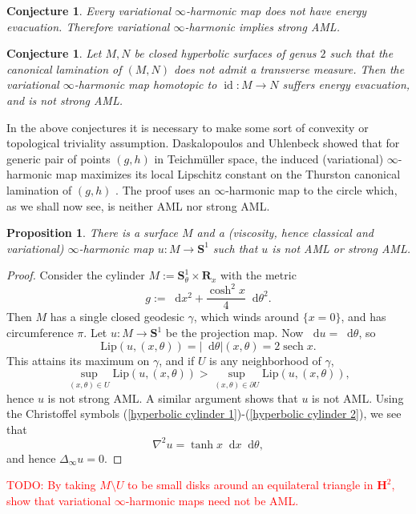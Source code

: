 \documentclass[reqno,11pt]{amsart}
\newcommand{\RR}{\mathbf{R}}
\newcommand{\Hyp}{\mathbf H}
\newcommand{\Sph}{\mathbf S}
\newcommand*\dif{\mathop{}\!\mathrm{d}}
\DeclareMathOperator{\id}{id}
\DeclareMathOperator{\sech}{sech}
\newcommand{\Lip}{\mathrm{Lip}}
\newtheorem{proposition}[theorem]{Proposition}
\newtheorem{conjecture}[theorem]{Conjecture}
\theoremstyle{definition}
\numberwithin{equation}{section}
\newcommand\todo[1]{\textcolor{red}{TODO: #1}}
\begin{document}
\begin{conjecture}
Every variational $\infty$-harmonic map does not have energy evacuation.
Therefore variational $\infty$-harmonic implies strong AML.
\end{conjecture}

\begin{conjecture}
Let $M, N$ be closed hyperbolic surfaces of genus $2$ such that the canonical lamination of $(M, N)$ does not admit a transverse measure.
Then the variational $\infty$-harmonic map homotopic to $\id: M \to N$ suffers energy evacuation, and is not strong AML.
\end{conjecture}

In the above conjectures it is necessary to make some sort of convexity or topological triviality assumption.
Daskalopoulos and Uhlenbeck showed that for generic pair of points $(g, h)$ in Teichm\"uller space, the induced (variational) $\infty$-harmonic map maximizes its local Lipschitz constant on the Thurston canonical lamination of $(g, h)$ \cite[Theorem 8.11]{daskalopoulos2022analytic}.
The proof uses an $\infty$-harmonic map to the circle which, as we shall now see, is neither AML nor strong AML.

\begin{proposition}
There is a surface $M$ and a (viscosity, hence classical and variational) $\infty$-harmonic map $u: M \to \Sph^1$ such that $u$ is not AML or strong AML.
\end{proposition}
\begin{proof}
Consider the cylinder $M := \Sph^1_\theta \times \RR_x$ with the metric
$$g := \dif x^2 + \frac{\cosh^2 x}{4} \dif \theta^2.$$
Then $M$ has a single closed geodesic $\gamma$, which winds around $\{x = 0\}$, and has circumference $\pi$.
Let $u: M \to \Sph^1$ be the projection map.
Now $\dif u = \dif \theta$, so
$$\Lip(u, (x, \theta)) = |\dif \theta|(x, \theta) = 2 \sech x.$$
This attains its maximum on $\gamma$, and if $U$ is any neighborhood of $\gamma$,
$$\sup_{(x, \theta) \in U} \Lip(u, (x, \theta)) > \sup_{(x, \theta) \in \partial U} \Lip(u, (x, \theta)),$$
hence $u$ is not strong AML.
A similar argument shows that $u$ is not AML.
Using the Christoffel symbols (\ref{hyperbolic cylinder 1})-(\ref{hyperbolic cylinder 2}), we see that
$$\nabla^2 u = \tanh x \dif x \dif \theta,$$
and hence $\Delta_\infty u = 0$.
\end{proof}

\todo{By taking $M \setminus U$ to be small disks around an equilateral triangle in $\Hyp^2$, show that variational $\infty$-harmonic maps need not be AML.}
\end{document}

